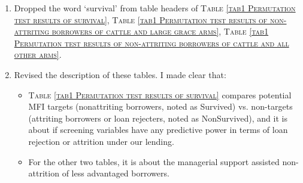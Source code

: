 \begin{enumerate}
\vspace{1.0ex}\setlength{\itemsep}{1.0ex}\setlength{\baselineskip}{12pt}
\item	Dropped the word `survival' from table headers of 
\textsc{\normalsize Table \ref{tab1 Permutation test results of survival}}, 
\textsc{\normalsize Table \ref{tab1 Permutation test results of non-attriting borrowers of cattle and large grace arms}}, 
\textsc{\normalsize Table \ref{tab1 Permutation test results of non-attriting borrowers of cattle and all other arms}}. 
\item	Revised the description of these tables. I made clear that:
	\begin{itemize}
	\vspace{1.0ex}\setlength{\itemsep}{1.0ex}\setlength{\baselineskip}{12pt}
	\item	\textsc{\normalsize Table \ref{tab1 Permutation test results of survival}} compares potential MFI targets (nonattriting borrowers, noted as \textsf{Survived}) vs. non-targets (attriting borrowers or loan rejecters, noted as \textsf{NonSurvived}), and it is about if screening variables have any predictive power in terms of loan rejection or attrition under our lending. 
	\item	For the other two tables, it is about the managerial support assisted non-attrition of less advantaged borrowers. \\~\\
	\end{itemize} 

\end{enumerate}

